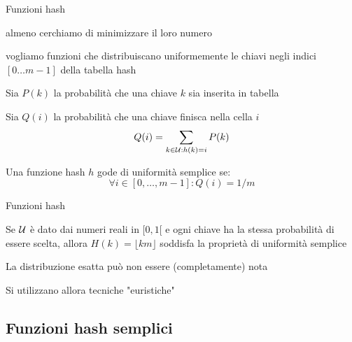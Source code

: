 \begin{frame}{Funzioni hash}

\vspace{-6pt}
\begin{myboxtitle}
\BI
\item almeno cerchiamo di minimizzare il loro numero
\item vogliamo funzioni che distribuiscano \alert{uniformemente} le chiavi negli 
  indici $[0 \ldots m-1]$ della tabella hash
\EI
\end{myboxtitle}

\begin{myboxtitle}
\BI
\item Sia $P(k)$ la probabilità che una chiave $k$ sia inserita in tabella
\item Sia $Q(i)$ la probabilità che una chiave finisca nella cella $i$
\[
  Q(i) = \sum_{k \in {\cal U}: h(k)=i} P(k)
\]
\item Una funzione hash $h$ gode di \alert{uniformità semplice} se:
\[
  \forall i \in [0, \ldots, m-1] : Q(i) = 1/m
\]
\EI
\end{myboxtitle}

\end{frame}


\begin{frame}{Funzioni hash}

\vspace{-6pt}

\begin{myboxtitle}[Esempio]
Se $\cal U$ è dato dai numeri reali in $[0,1[$  e ogni chiave ha la stessa probabilità di essere scelta, allora 
$H(k) = \lfloor km \rfloor$ soddisfa la proprietà di uniformità semplice
\end{myboxtitle}


\BIL
\item La distribuzione esatta può non essere (completamente) nota
\item Si utilizzano allora tecniche "\alert{euristiche}"
\EIL

\end{frame}

\subsection{Funzioni hash semplici}

